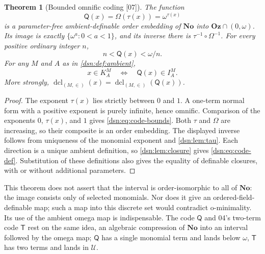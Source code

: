 \documentclass[11pt,a4paper]{article}
\numberwithin{equation}{section}
\newtheorem{theorem}{Theorem}[section]
\theoremstyle{definition}
\theoremstyle{remark}
\newcommand{\No}{\mathbf{No}}
\newcommand{\Oz}{\mathbf{Oz}}
\newcommand{\dcl}{\operatorname{dcl}}
\newcommand{\Two}{\mathsf T}
\newcommand{\Mc}{\mathsf Q}
\newcommand{\Cell}{\mathcal U}
\newcommand{\src}[1]{\textup{\textsf{\small[#1]}}}
\begin{document}
\begin{theorem}[Bounded omnific coding \src{07}]\label{dsn:thm:bounded-code}
The function
\begin{equation}\label{dsn:eq:mcode}
 \Mc(x)=\Omega(\tau(x))=\omega^{\tau(x)}
\end{equation}
is a parameter-free ambient-definable order embedding of $\No$ into
$\Oz\cap(0,\omega)$. Its image is exactly $\{\omega^a:0<a<1\}$, and its
inverse there is $\tau^{-1}\circ\Omega^{-1}$. For every positive ordinary
integer $n$,
\begin{equation}\label{dsn:eq:code-bounds}
 n<\Mc(x)<\omega/n.
\end{equation}
For any $M$ and $A$ as in \cref{dsn:def:ambient},
\begin{equation}\label{dsn:eq:code-def}
 x\in K^M_A\quad\Longleftrightarrow\quad \Mc(x)\in I^M_A.
\end{equation}
More strongly, $\dcl_{(M,\in)}(x)=\dcl_{(M,\in)}(\Mc(x))$.
\end{theorem}
\begin{proof}
The exponent $\tau(x)$ lies strictly between $0$ and $1$. A one-term normal
form with a positive exponent is purely infinite, hence omnific.
Comparison of the exponents $0$, $\tau(x)$, and $1$ gives
\eqref{dsn:eq:code-bounds}. Both $\tau$ and $\Omega$ are increasing, so
their composite is an order embedding. The displayed inverse follows from
uniqueness of the monomial exponent and \cref{dsn:lem:tau}. Each direction
is a unique ambient definition, so \cref{dsn:lem:closure} gives
\eqref{dsn:eq:code-def}. Substitution of these definitions also gives the
equality of definable closures, with or without additional parameters.
\end{proof}

This theorem does not assert that the interval is order-isomorphic to all
of $\No$: the image consists only of selected monomials. Nor does it give
an ordered-field-definable map; such a map into this discrete set would
contradict o-minimality. Its use of the ambient omega map is
indispensable. The code $\Mc$ and 04's two-term code $\Two$ rest on the
same idea, an algebraic compression of $\No$ into an interval followed by
the omega map; $\Mc$ has a single monomial term and lands below $\omega$,
$\Two$ has two terms and lands in $\Cell$.
\end{document}
